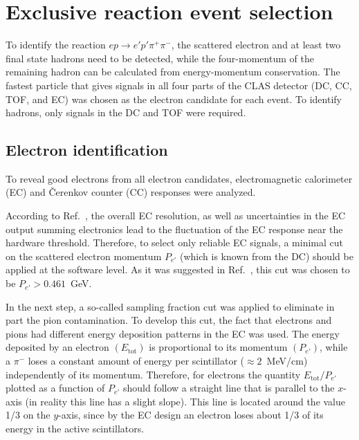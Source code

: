 \documentclass[prc,twocolumn,superscriptaddress,showpacs,amssymb,amsmath,amsfonts,aps,nofootinbib]{revtex4-1}
\begin{document}
\section{Exclusive reaction event selection}
\label{expt}

To identify the reaction $e p \rightarrow e' p' \pi^{+} \pi^{-}$, the scattered electron and at least two final state hadrons need to be detected, while the four-momentum of the remaining hadron can be calculated from energy-momentum conservation. The fastest particle that gives signals in all four parts of the CLAS detector (DC, CC, TOF, and EC) was chosen as the electron candidate for each event. To identify hadrons, only signals in the DC and TOF were required. 



\subsection{Electron identification}

To reveal good electrons from all electron candidates,  electromagnetic calorimeter (EC) and \v Cerenkov counter (CC) responses were analyzed.

According to Ref.~\cite{Egian:007}, the overall EC resolution, as well as uncertainties in the EC output summing electronics lead to the fluctuation of the EC response near the hardware threshold. Therefore, to select only reliable EC signals, a minimal cut on the scattered electron momentum $P_{e'}$ (which is known from the DC) should be applied at the software level. As it was suggested in Ref.~\cite{Egian:007}, this cut was chosen to be $P_{e'} > 0.461$~GeV.


In the next step, a so-called sampling fraction cut was applied to  eliminate in part the pion contamination. To develop this cut, the fact that electrons and pions
had different  energy deposition patterns in the EC was used. The energy  
deposited by an electron $(E_{\text{tot}})$ is proportional to its momentum $(P_{e'})$, while a $\pi^{-}$ loses a constant
amount of energy per scintillator ($\approx 2$~MeV/cm) independently of its momentum. 
Therefore, for electrons the quantity $E_{\text{tot}}/P_{e'}$ plotted as a function of $P_{e'}$ should follow a straight line that is parallel to the $x$-axis (in reality this line has a slight slope). This line is located  around the value 1/3 on the $y$-axis, since by the EC design an electron loses about 1/3 of its energy in the active scintillators.
\end{document}
